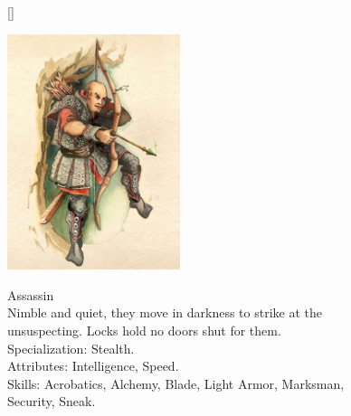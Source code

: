 \documentclass[12pt]{book}
\begin{document}
\begin{figure}[H]
[\FBwidth]
{\caption*{Assassin\\

Nimble and quiet, they move in darkness to strike at the unsuspecting. Locks hold no doors shut for them.\\

Specialization: Stealth.\\

Attributes: Intelligence, Speed.\\

Skills: Acrobatics, Alchemy, Blade, Light Armor, Marksman, Security, Sneak.}\label{fig:test}}
{\includegraphics[width=0.45\textwidth]{Assassin.png}}
\end{figure}
\end{document}
